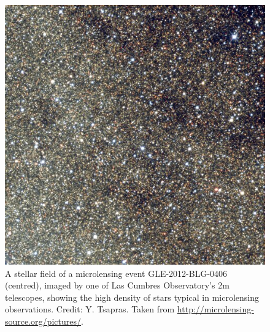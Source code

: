 \documentclass[12pt,dvipsnames]{report}
\begin{document}
\begin{figure}
    \begin{centering}
        \includegraphics[width=0.5\linewidth]{../static/microlensing/crowded_field.jpg}
        \caption{
            A stellar field of a microlensing event GLE-2012-BLG-0406 (centred),
            imaged by one of Las Cumbres Observatory's 2m telescopes,
            showing the high density of stars typical in microlensing observations.
            Credit: Y. Tsapras. Taken from
            \url{http://microlensing-source.org/pictures/}.}
        \label{fig:crowded_field}
    \end{centering}
\end{figure}
\end{document}
